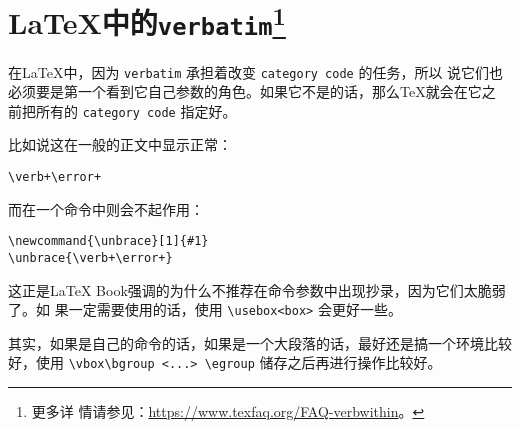 
\section[\LaTeX{}中的{\tt verbatim}]{\LaTeX{}中的{\tt verbatim}\footnote{更多详
情请参见：\url{https://www.texfaq.org/FAQ-verbwithin}。}}

在\LaTeX{}中，因为 \verb|verbatim| 承担着改变 \verb|category code| 的任务，所以
说它们也必须要是第一个看到它自己参数的角色。如果它不是的话，那么\TeX{}就会在它之
前把所有的 \verb|category code| 指定好。

比如说这在一般的正文中显示正常：
\begin{lstlisting}
\verb+\error+
\end{lstlisting}

而在一个命令中则会不起作用：
\begin{lstlisting}
\newcommand{\unbrace}[1]{#1}
\unbrace{\verb+\error+}
\end{lstlisting}

这正是\LaTeX{} Book强调的为什么不推荐在命令参数中出现抄录，因为它们太脆弱了。如
果一定需要使用的话，使用 \verb|\usebox<box>| 会更好一些。

其实，如果是自己的命令的话，如果是一个大段落的话，最好还是搞一个环境比较好，使用
\verb|\vbox\bgroup <...> \egroup| 储存之后再进行操作比较好。


